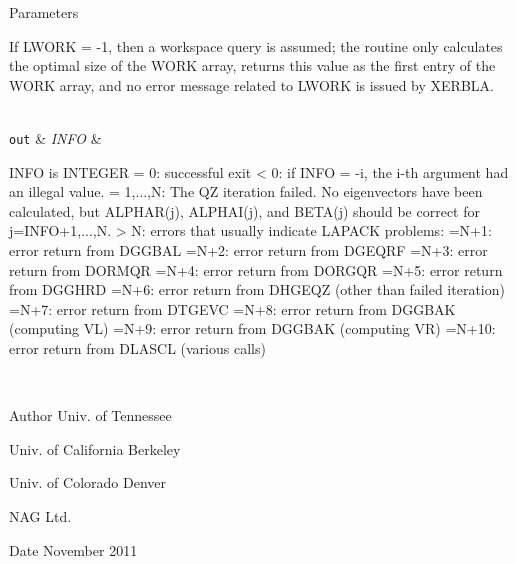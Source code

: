 \begin{DoxyParams}[1]{Parameters}
\begin{DoxyVerb}
          If LWORK = -1, then a workspace query is assumed; the routine
          only calculates the optimal size of the WORK array, returns
          this value as the first entry of the WORK array, and no error
          message related to LWORK is issued by XERBLA.\end{DoxyVerb}
\\
\hline
\mbox{\tt out}  & {\em I\+N\+F\+O} & \begin{DoxyVerb}          INFO is INTEGER
          = 0:  successful exit
          < 0:  if INFO = -i, the i-th argument had an illegal value.
          = 1,...,N:
                The QZ iteration failed.  No eigenvectors have been
                calculated, but ALPHAR(j), ALPHAI(j), and BETA(j)
                should be correct for j=INFO+1,...,N.
          > N:  errors that usually indicate LAPACK problems:
                =N+1: error return from DGGBAL
                =N+2: error return from DGEQRF
                =N+3: error return from DORMQR
                =N+4: error return from DORGQR
                =N+5: error return from DGGHRD
                =N+6: error return from DHGEQZ (other than failed
                                                iteration)
                =N+7: error return from DTGEVC
                =N+8: error return from DGGBAK (computing VL)
                =N+9: error return from DGGBAK (computing VR)
                =N+10: error return from DLASCL (various calls)\end{DoxyVerb}
 \\
\hline
\end{DoxyParams}
\begin{DoxyAuthor}{Author}
Univ. of Tennessee 

Univ. of California Berkeley 

Univ. of Colorado Denver 

N\+A\+G Ltd. 
\end{DoxyAuthor}
\begin{DoxyDate}{Date}
November 2011 
\end{DoxyDate}
